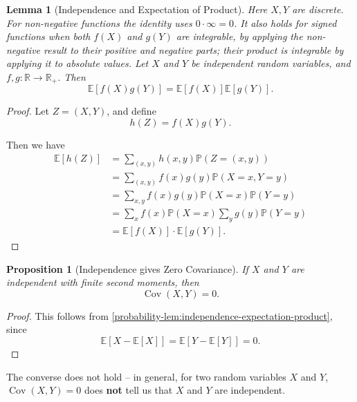 \documentclass[11pt]{article}
\numberwithin{equation}{section}
\newtheorem{lemma}[theorem]{Lemma}
\newtheorem{proposition}[theorem]{Proposition}
\theoremstyle{definition}
\theoremstyle{remark}
\newcommand{\pqty}[1]{\left(#1\right)}
\newcommand{\bqty}[1]{\left[#1\right]}
\newcommand{\functiondomain}[3]{#1:#2\to #3}
\newcommand{\RR}{\mathbb R}
\newcommand{\Prob}{\mathbb P}
\newcommand{\Expt}{\mathbb E}
\DeclareMathOperator{\Cov}{Cov}
\begin{document}
\begin{lemma}[Independence and Expectation of Product]\label{probability-lemma-006}
    \label{probability-lem:independence-expectation-product}%
Here \(X,Y\) are discrete. For non-negative functions the identity uses \(0\cdot\infty=0\). It also holds for signed functions when both \(f(X)\) and \(g(Y)\) are integrable, by applying the non-negative result to their positive and negative parts; their product is integrable by applying it to absolute values.
    Let \(X\) and \(Y\) be independent random variables, and \(\functiondomain{f, g}{\RR}{\RR_{+}}\). Then
    \[
        \Expt\bqty{f\pqty{X} g\pqty{Y}} = \Expt\bqty{f\pqty{X}} \Expt\bqty{g\pqty{Y}}.
    \]
\end{lemma}

\begin{proof}\label{probability-proof-025}
    Let \(Z = \pqty{X, Y}\), and define
    \[  
        h\pqty{Z} = f\pqty{X} g\pqty{Y}.
    \]

    Then we have
    \begin{align*}
        \Expt\bqty{h\pqty{Z}} &= \sum_{\pqty{x, y}} h\pqty{x, y} \Prob\pqty{Z = \pqty{x, y}} \\
        &= \sum_{\pqty{x, y}} f\pqty{x} g\pqty{y} \Prob\pqty{X = x, Y = y} \\
        &= \sum_{x, y} f\pqty{x} g\pqty{y} \Prob\pqty{X = x} \Prob\pqty{Y = y} \\
        &= \sum_{x} f\pqty{x} \Prob\pqty{X = x} \sum_{y} g\pqty{y} \Prob\pqty{Y = y} \\
        &= \Expt\bqty{f\pqty{X}} \cdot \Expt\bqty{g\pqty{Y}}.
    \end{align*}
\end{proof}

\begin{proposition}[Independence gives Zero Covariance]\label{probability-proposition-016}
    If \(X\) and \(Y\) are independent with finite second moments, then
    \[
        \Cov\pqty{X, Y} = 0.
    \]
\end{proposition}

\begin{proof}\label{probability-proof-026}
    This follows from \autoref{probability-lem:independence-expectation-product}, since
    \[
        \Expt\bqty{X - \Expt\bqty{X}} = \Expt\bqty{Y - \Expt\bqty{Y}} = 0.
    \]
\end{proof}

The converse does not hold -- in general, for two random variables \(X\) and \(Y\), \(\Cov\pqty{X, Y} = 0\) does \textbf{not} tell us that \(X\) and \(Y\) are independent.
\end{document}
